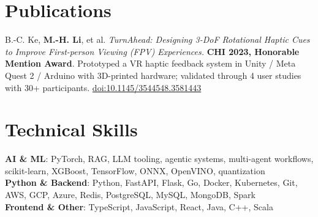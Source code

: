 \documentclass[letterpaper,11pt]{article}
\begin{document}
\section{Publications}
\small B.-C. Ke, \textbf{M.-H. Li}, et al. \textit{TurnAhead: Designing 3-DoF Rotational Haptic Cues to Improve First-person Viewing (FPV) Experiences.} \textbf{CHI 2023, Honorable Mention Award}. Prototyped a VR haptic feedback system in Unity / Meta Quest 2 / Arduino with 3D-printed hardware; validated through 4 user studies with 30+ participants. \href{https://dl.acm.org/doi/10.1145/3544548.3581443}{doi:10.1145/3544548.3581443}


\section{Technical Skills}
 \begin{itemize}[leftmargin=0.15in, label={}]
    \small{\item{
\textbf{AI \& ML}{: PyTorch, RAG, LLM tooling, agentic systems, multi-agent workflows, scikit-learn, XGBoost, TensorFlow, ONNX, OpenVINO, quantization} \\
\textbf{Python \& Backend}{: Python, FastAPI, Flask, Go, Docker, Kubernetes, Git, AWS, GCP, Azure, Redis, PostgreSQL, MySQL, MongoDB, Spark} \\
\textbf{Frontend \& Other}{: TypeScript, JavaScript, React, Java, C++, Scala}
    }}
 \end{itemize}
\end{document}
